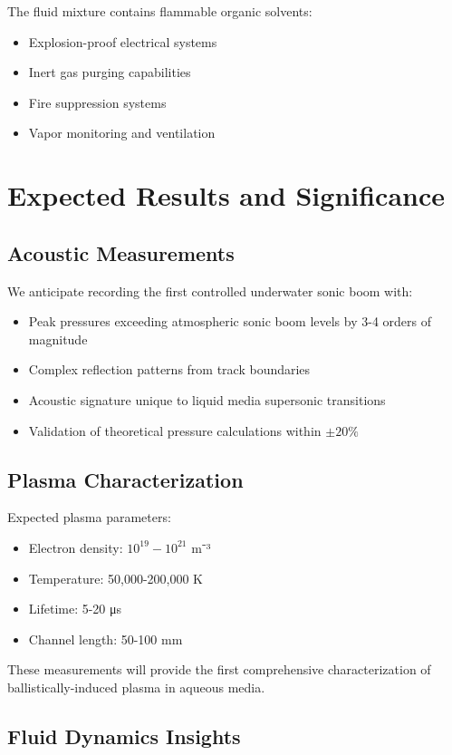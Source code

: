 \documentclass[12pt,a4paper]{article}
\begin{document}
The fluid mixture contains flammable organic solvents:
\begin{itemize}
\item Explosion-proof electrical systems
\item Inert gas purging capabilities
\item Fire suppression systems
\item Vapor monitoring and ventilation
\end{itemize}

\section{Expected Results and Significance}

\subsection{Acoustic Measurements}

We anticipate recording the first controlled underwater sonic boom with:
\begin{itemize}
\item Peak pressures exceeding atmospheric sonic boom levels by 3-4 orders of magnitude
\item Complex reflection patterns from track boundaries
\item Acoustic signature unique to liquid media supersonic transitions
\item Validation of theoretical pressure calculations within $\pm 20\%$
\end{itemize}

\subsection{Plasma Characterization}

Expected plasma parameters:
\begin{itemize}
\item Electron density: $10^{19}-10^{21}$ m⁻³
\item Temperature: 50,000-200,000 K
\item Lifetime: 5-20 μs
\item Channel length: 50-100 mm
\end{itemize}

These measurements will provide the first comprehensive characterization of ballistically-induced plasma in aqueous media.

\subsection{Fluid Dynamics Insights}
\end{document}
